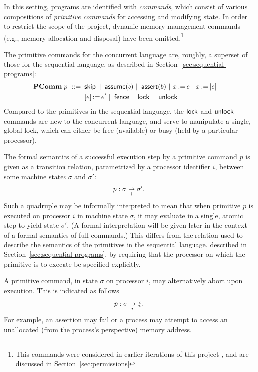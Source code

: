 \documentclass[11pt]{report}         %
\begin{document}
In this setting, programs are identified with \emph{commands}, which consist of various compositions of \emph{primitive commands} for accessing and modifying state. In order to restrict the scope of the project, dynamic memory management commands (e.g., memory allocation and disposal) have been omitted.\footnote{This commands were considered in earlier iterations of this project \cite{wmsldetails,lola11}, and are discussed in Section~\ref{sec:permissions}}

The primitive commands for the concurrent language are, roughly, a superset of those for the sequential language, as described in Section~\ref{sec:sequential-programs}: \begin{align*} \mathbf{PComm}~p ~::=~ & \operatorname{\mathsf{skip}} ~|~ \operatorname{\mathsf{assume}}(b) ~|~ \operatorname{\mathsf{assert}}(b) ~|~ x \operatorname{:\!=} e ~|~ x \operatorname{:\!=} \left[ e \right] ~|~ \\ 
      & \left[ e \right] \operatorname{:\!=} e' ~|~ \operatorname{\mathsf{fence}} ~|~ \operatorname{\mathsf{lock}} ~|~ \operatorname{\mathsf{unlock}}  
\end{align*} Compared to the primitives in the sequential language, the $\operatorname{\mathsf{lock}}$ and $\operatorname{\mathsf{unlock}}$ commands are new to the concurrent language, and serve to manipulate a single, global lock, which can either be free (available) or busy (held by a particular processor). 

The formal semantics of a successful execution step by a primitive command $p$ is given as a transition relation, parametrized by a processor identifier $i$, between some machine states $\sigma$ and $\sigma'$: \[ p : \sigma \underset{i}{\rightarrow} \sigma'. \] Such a quadruple may be informally interpreted to mean that when primitive $p$ is executed on processor $i$ in machine state $\sigma$, it may evaluate in a single, atomic step to yield state $\sigma'$. (A formal interpretation will be given later in the context of a formal semantics of full commands.) This differs from the relation used to describe the semantics of the primitives in the sequential language, described in Section~\ref{sec:sequential-programs}, by requiring that the processor on which the primitive is to execute be specified explicitly. 

A primitive command, in state $\sigma$ on processor $i$, may alternatively abort upon execution. This is indicated as follows \[ p : \sigma \underset{i}{\rightarrow} \lightning. \] For example, an assertion may fail or a process may attempt to access an unallocated (from the process's perspective) memory address. 
\end{document}
